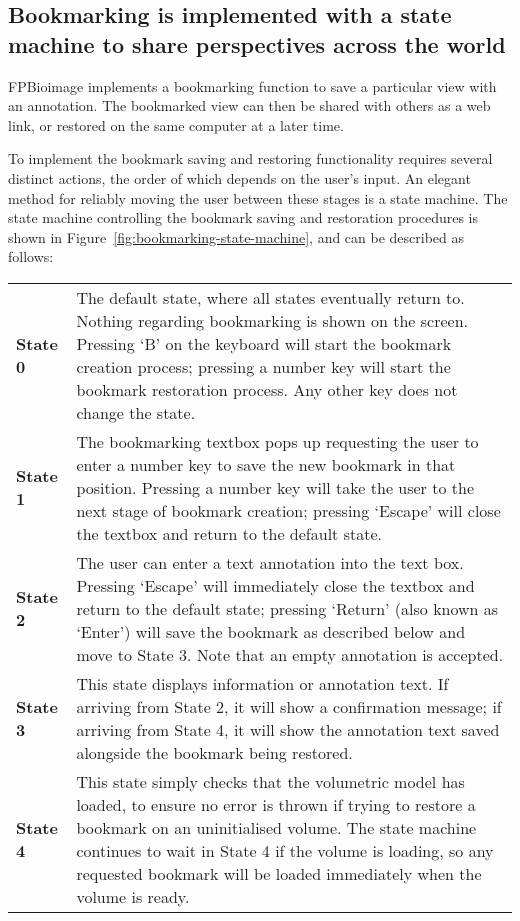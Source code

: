 \subsection{Bookmarking is implemented with a state machine to share perspectives across the world}
FPBioimage implements a bookmarking function to save a particular view with an annotation.
The bookmarked view can then be shared with others as a web link, or restored on the same computer at a later time.

To implement the bookmark saving and restoring functionality requires several distinct actions, the order of which depends on the user's input.
An elegant method for reliably moving the user between these stages is a state machine.
The state machine controlling the bookmark saving and restoration procedures is shown in Figure~\ref{fig:bookmarking-state-machine}, and can be described as follows:
\begin{tabular}{>{\bfseries}l p{}}
State 0 & The default state, where all states eventually return to. Nothing regarding bookmarking is shown on the screen. Pressing `B' on the keyboard will start the bookmark creation process; pressing a number key will start the bookmark restoration process. Any other key does not change the state. \\
State 1 & The bookmarking textbox pops up requesting the user to enter a number key to save the new bookmark in that position. Pressing a number key will take the user to the next stage of bookmark creation; pressing `Escape' will close the textbox and return to the default state. \\
State 2 & The user can enter a text annotation into the text box. Pressing `Escape' will immediately close the textbox and return to the default state; pressing `Return' (also known as `Enter') will save the bookmark as described below and move to State 3. Note that an empty annotation is accepted. \\
State 3 & This state displays information or annotation text. If arriving from State 2, it will show a confirmation message; if arriving from State 4, it will show the annotation text saved alongside the bookmark being restored. \\
State 4 & This state simply checks that the volumetric model has loaded, to ensure no error is thrown if trying to restore a bookmark on an uninitialised volume. The state machine continues to wait in State 4 if the volume is loading, so any requested bookmark will be loaded immediately when the volume is ready. \\
\end{tabular}

